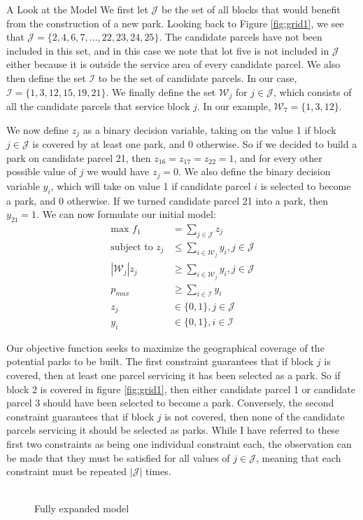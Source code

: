 \documentclass[12pt]{pom_thesis}
\theoremstyle{definition}
\begin{document}
\begin{chapter}{A Look at the Model}
	We first let $\mathcal{J}$ be the set of all blocks that would benefit from the construction of a new park. Looking back to Figure \ref{fig:grid1}, we see that $\mathcal{J} = \{ 2,4,6,7, \dots, 22, 23, 24, 25\}$. The candidate parcels have not been included in this set, and in this case we note that lot five is not included in $\mathcal{J}$ either because it is outside the service area of every candidate parcel. We also then define the set $\mathcal{I}$ to be the set of candidate parcels. In our case, $\mathcal{I} = \{ 1,3,12,15,19,21\}$. We finally define the set $\mathcal{W}_j$ for $j \in \mathcal{J}$, which consists of all the candidate parcels that service block $j$. In our example, $\mathcal{W}_7 = \{1,3,12\}$. \newline
	
	We now define $z_j$ as a binary decision variable, taking on the value 1 if block $j \in \mathcal{J}$ is covered by at least one park, and 0 otherwise. So if we decided to build a park on candidate parcel 21, then $z_{16} = z_{17} = z_{22} = 1$, and for every other possible value of $j$ we would have $z_j = 0$. We also define the binary decision variable $y_i$, which will take on value 1 if candidate parcel $i$ is selected to become a park, and 0 otherwise. If we turned candidate parcel 21 into a park, then $y_{21} = 1$. We can now formulate our initial model:
\begin{align*}
\textrm{max } f_1 &= \sum_{j \in \mathcal{J}} z_j \\
\textrm{subject to } z_j &\leq \sum_{i \in \mathcal{W}_j} y_i, j \in \mathcal{J}\\
\left|\mathcal{W}_j\right|z_j &\geq \sum_{i \in \mathcal{W}_j} y_i, j \in \mathcal{J} \\
p_{max} &\geq \sum_{i \in \mathcal{I}} y_i \\
z_j &\in \{0,1\}, j \in \mathcal{J} \\
y_i &\in \{0,1\}, i \in \mathcal{I}
\end{align*}

	Our objective function seeks to maximize the geographical coverage of the potential parks to be built. The first constraint guarantees that if block $j$ is covered, then at least one parcel servicing it has been selected as a park. So if block 2 is covered in figure \ref{fig:grid1}, then either candidate parcel 1 or candidate parcel 3 should have been selected to become a park. Conversely, the second constraint guarantees that if block $j$ is not covered, then none of the candidate parcels servicing it should be selected as parks. While I have referred to these first two constraints as being one individual constraint each, the observation can be made that they must be satisfied for all values of $j \in \mathcal{J}$, meaning that each constraint must be repeated $|\mathcal{J}|$ times. \\ \\
	\begin{figure}
	\centering
	\caption{Fully expanded model}
	\label{expandedmodel}
	

\end{figure}
\end{chapter}
\end{document}
